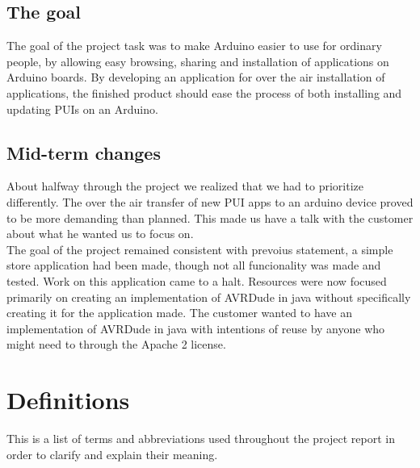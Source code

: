 \section{The goal}
The goal of the project task was to make Arduino easier to use for ordinary people, by allowing easy browsing, sharing and installation of applications on Arduino boards. By developing an application for over the air installation of applications, the finished product should ease the process of both installing and updating PUIs on an Arduino.

\section{Mid-term changes}
About halfway through the project we realized that we had to prioritize differently. The over the air transfer of new PUI apps to an arduino device proved to be more demanding than planned. This made us have a talk with the customer about what he wanted us to focus on. \\
\newline
The goal of the project remained consistent with prevoius statement, a simple store application had been made, though not all funcionality was made and tested. Work on this application came to a halt. Resources were now focused primarily on creating an implementation of AVRDude in java without specifically creating it for the application made. The customer wanted to have an implementation of AVRDude in java with intentions of reuse by anyone who might need to through the Apache 2 license. 

\chapter{Definitions}
This is a list of terms and abbreviations used throughout the project report in order to clarify and explain their meaning.

